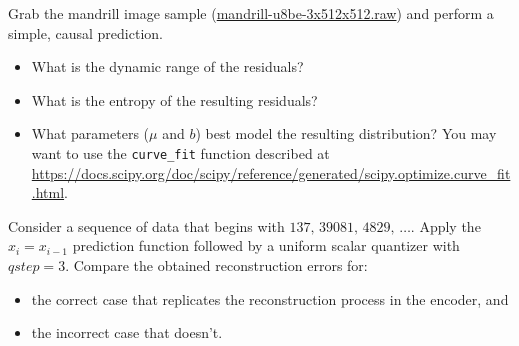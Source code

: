 \begin{exercise}
Grab the mandrill image sample (\url{mandrill-u8be-3x512x512.raw})
and perform a simple, causal prediction.
\begin{itemize}
    \item What is the dynamic range of the residuals?
    \item What is the entropy of the resulting residuals?
    \item What parameters ($\mu$ and $b$) best model the resulting distribution?
    You may want to use the \texttt{curve\_fit} function described at \url{https://docs.scipy.org/doc/scipy/reference/generated/scipy.optimize.curve_fit.html}.
\end{itemize}
\end{exercise}

\begin{exercise}
Consider a sequence of data that begins with $137,\,39081,\,4829,\,\ldots$. Apply the $\hat{x}_i = x_{i-1}$ prediction function followed by a uniform scalar quantizer with $qstep=3$. Compare the obtained reconstruction errors for:
\begin{itemize}
\item the correct case that replicates the reconstruction process in the encoder, and
\item the incorrect case that doesn't.
\end{itemize}

\end{exercise}



